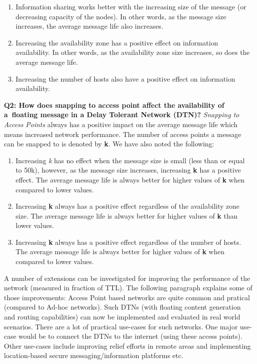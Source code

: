 \begin{enumerate}
  \item Information sharing works better with the increasing size of the message (or decreasing capacity of the nodes). In other words, as the message size increases, the average message life also increases.
  \item Increasing the availability zone has a positive effect on information availability. In other words, as the availability zone size increases, so does the average message life.
  \item Increasing the number of hosts also have a positive effect on information availability.
\end{enumerate}
\vspace{4mm}
\textbf{Q2: How does snapping to access point affect the availability of a floating message in a Delay Tolerant Network (DTN)?}\newline
\textit{Snapping to Access Points} always has a positive impact on the average message life which means increased network performance. The number of access points a message can be snapped to is denoted by \textbf{k}. We have also noted the following:
\begin{enumerate}
  \item Increasing \textit{k} has no effect when the message size is small (less than or equal to 50k), however, as the message size increases, increasing \textbf{k} has a positive effect. The average message life is always better for higher values of \textbf{k} when compared to lower values.
  \item Increasing \textbf{k} always has a positive effect regardless of the availability zone size. The average message life is always better for higher values of \textbf{k} than lower values.
  \item Increasing \textbf{k} always has a positive effect regardless of the number of hosts. The average message life is always better for higher values of \textbf{k} when compared to lower values.
\end{enumerate}
A number of extensions can be investigated for improving the performance of the network (measured in fraction of TTL). The following paragraph explains some of those improvements:\newline
Access Point based networks are quite common and pratical (compared to Ad-hoc networks). Such DTNs (with floating content generation and routing capabilities) can now be implemented and evaluated in real world scenarios. There are a lot of practical use-cases for such networks. One major use-case would be to connect the DTNs to the internet (using these access points). Other use-cases include improving relief efforts in remote areas and implementing location-based secure messaging/information platforms etc. \newline
